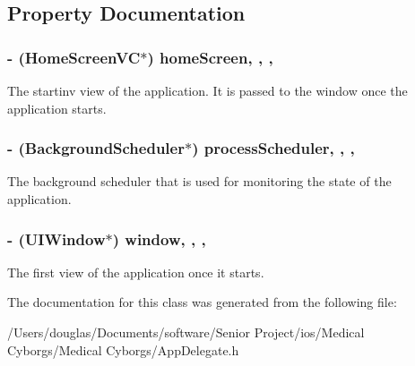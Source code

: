 \subsection{Property Documentation}
\hypertarget{interface_app_delegate_a22a5a481802e14bae7bd6cbffd141c65}{
\subsubsection[{home\-Screen}]{\setlength{\rightskip}{0pt plus 5cm}-\/ ({\bf Home\-Screen\-V\-C}$\ast$) home\-Screen\hspace{0.3cm}{\ttfamily [read]}, {\ttfamily [write]}, {\ttfamily [atomic]}, {\ttfamily [strong]}}}\label{interface_app_delegate_a22a5a481802e14bae7bd6cbffd141c65}
The startinv view of the application. It is passed to the window once the application starts. \hypertarget{interface_app_delegate_a7774bb6fd8b636a6d6b15f91f2809a91}{
\subsubsection[{process\-Scheduler}]{\setlength{\rightskip}{0pt plus 5cm}-\/ ({\bf Background\-Scheduler}$\ast$) process\-Scheduler\hspace{0.3cm}{\ttfamily [read]}, {\ttfamily [write]}, {\ttfamily [nonatomic]}, {\ttfamily [strong]}}}\label{interface_app_delegate_a7774bb6fd8b636a6d6b15f91f2809a91}
The background scheduler that is used for monitoring the state of the application. \hypertarget{interface_app_delegate_acf48ac24125e688cac1a85445cd7fac2}{
\subsubsection[{window}]{\setlength{\rightskip}{0pt plus 5cm}-\/ (U\-I\-Window$\ast$) window\hspace{0.3cm}{\ttfamily [read]}, {\ttfamily [write]}, {\ttfamily [nonatomic]}, {\ttfamily [strong]}}}\label{interface_app_delegate_acf48ac24125e688cac1a85445cd7fac2}
The first view of the application once it starts. 

The documentation for this class was generated from the following file\-:\begin{DoxyCompactItemize}
\item 
/\-Users/douglas/\-Documents/software/\-Senior Project/ios/\-Medical Cyborgs/\-Medical Cyborgs/App\-Delegate.\-h\end{DoxyCompactItemize}
